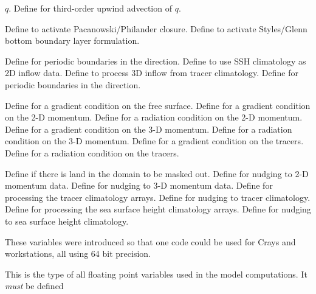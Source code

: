 \begin{klist}
\begin{klist}
\begin{klist}
   $q$.
       Define for third-order upwind advection of $q$.
    \end{klist}
       Define to activate Pacanowski/Philander
   closure.
       Define to activate Styles/Glenn bottom
   boundary layer formulation.
  \end{klist}
   \mbox{}
  \begin{klist}
       Define for periodic boundaries in the
    direction.
           Define to use SSH climatology as 2D inflow
   data.
           Define to process 3D inflow from tracer
   climatology.
       Define for periodic boundaries in the
    direction.
  \end{klist}
   \mbox{}
  \begin{klist}
       Define for a gradient
   condition on the free surface.
       Define for a gradient
   condition on the 2-D momentum.
       Define for a radiation
   condition on the 2-D momentum.
       Define for a gradient
   condition on the 3-D momentum.
       Define for a radiation
   condition on the 3-D momentum.
       Define for a gradient
   condition on the tracers.
       Define for a radiation
   condition on the tracers.
  \end{klist}
   \mbox{}
  \begin{klist}
        Define if there is land in the domain to be
   masked out.
          Define for nudging to 2-D momentum data.
          Define for nudging to 3-D momentum data.
      Define for processing the tracer climatology arrays.
          Define for nudging to tracer climatology.
      Define for processing the sea surface height
   climatology arrays.
          Define for nudging to sea surface height
   climatology.
  \end{klist}
     These variables were introduced so that one
  code could be used for Crays and workstations, all using 64 bit
  precision.
  \begin{klist}
        This is the type of all floating point
  variables used in the model computations.  It {\sl must} be defined

\end{klist}
\end{klist}

